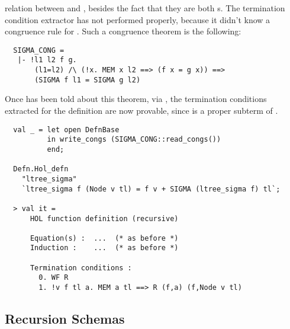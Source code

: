 relation between  and , besides the fact
that they are both s. The termination condition extractor
has not performed properly, because it didn't know a congruence rule
for . Such a congruence theorem is the following:
%
\begin{hol}
\begin{verbatim}
  SIGMA_CONG =
   |- !l1 l2 f g.
       (l1=l2) /\ (!x. MEM x l2 ==> (f x = g x)) ==>
       (SIGMA f l1 = SIGMA g l2)
\end{verbatim}
\end{hol}
%
Once  has been told about this theorem, via
, the termination conditions extracted for
the definition are now provable, since  is a
proper subterm of .
%
\begin{session}
\begin{hol}
\begin{verbatim}
  val _ = let open DefnBase
          in write_congs (SIGMA_CONG::read_congs())
          end;

  Defn.Hol_defn
    "ltree_sigma"
    `ltree_sigma f (Node v tl) = f v + SIGMA (ltree_sigma f) tl`;

  > val it =
      HOL function definition (recursive)

      Equation(s) :  ...  (* as before *)
      Induction :    ...  (* as before *)

      Termination conditions :
        0. WF R
        1. !v f tl a. MEM a tl ==> R (f,a) (f,Node v tl)
\end{verbatim}
\end{hol}
\end{session}

\subsection{Recursion Schemas}

